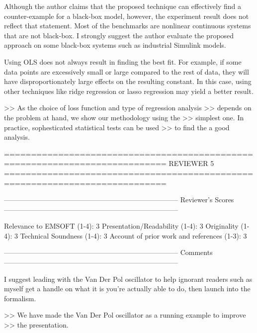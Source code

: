 Although the author claims that the proposed technique can effectively find a
counter-example for a black-box model, however, the experiment result does not
reflect that statement. Most of the benchmarks are nonlinear continuous systems
that are not black-box. I strongly suggest the author evaluate the proposed
approach on some black-box systems such as industrial Simulink models.

Using OLS does not always result in finding the best fit. For example, if some
data points are excessively small or large compared to the rest of data, they
will have disproportionately large effects on the resulting constant. In this
case, using other techniques like ridge regression or lasso regression may
yield a better result.

>> As the choice of loss function and type of regression analysis
>> depends on the problem at hand, we show our methodology using the
>> simplest one. In practice, sophesticated statistical tests can be used
>> to find the a good analysis.


============================================================================
                            REVIEWER 5
============================================================================


---------------------------------------------------------------------------
Reviewer's Scores
---------------------------------------------------------------------------

               Relevance to EMSOFT (1-4): 3
          Presentation/Readability (1-4): 3
                       Originality (1-4): 3
               Technical Soundness (1-4): 3
Account of prior work and references (1-3): 3


---------------------------------------------------------------------------
Comments
---------------------------------------------------------------------------

I suggest leading with the Van Der Pol oscillator to help ignorant
readers such as myself get a handle on what it is you're actually able
to do, then launch into the formalism.

>> We have made the Van Der Pol oscillator as a running example to improve
>> the presentation.
